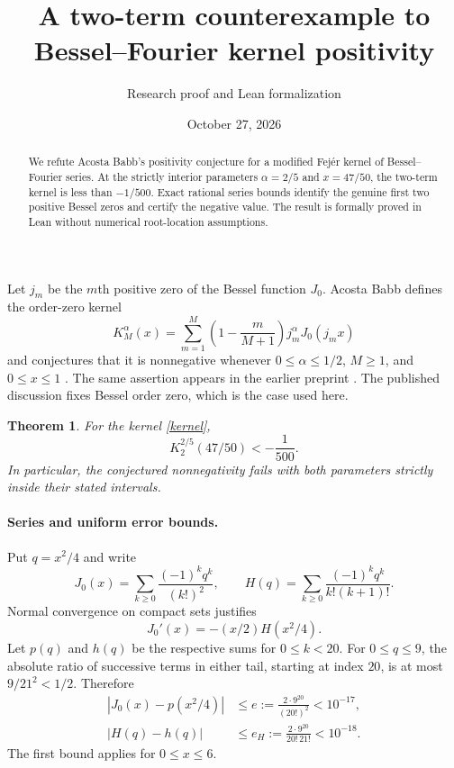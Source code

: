\documentclass[11pt]{article}
\title{A two-term counterexample to Bessel--Fourier kernel positivity}
\author{Research proof and Lean formalization}
\date{October 27, 2026}
\newtheorem{theorem}{Theorem}
\newcommand{\J}{J_0}
\begin{document}
\maketitle
\begin{abstract}
We refute Acosta Babb's positivity conjecture for a modified Fej\'er kernel
of Bessel--Fourier series. At the strictly interior parameters
$\alpha=2/5$ and $x=47/50$, the two-term kernel is less than $-1/500$.
Exact rational series bounds identify the genuine first two positive
Bessel zeros and certify the negative value. The result is formally proved
in Lean without numerical root-location assumptions.
\end{abstract}

Let $j_m$ be the $m$th positive zero of the Bessel function $\J$.
Acosta Babb defines the order-zero kernel
\begin{equation}\label{kernel}
 K_M^\alpha(x)=\sum_{m=1}^{M}\left(1-\frac{m}{M+1}\right)
 j_m^\alpha\J(j_mx)
\end{equation}
and conjectures that it is nonnegative whenever
$0\leq\alpha\leq1/2$, $M\geq1$, and $0\leq x\leq1$
\cite[Conjecture~1, p.~11]{Babb26}.
The same assertion appears in the earlier preprint
\cite[Conjecture~1, p.~10]{Babb24}.
The published discussion fixes Bessel order zero, which is the case used here.

\begin{theorem}\label{main}
For the kernel \eqref{kernel},
\[
 K_2^{2/5}(47/50)<-\frac1{500}.
\]
In particular, the conjectured nonnegativity fails with both parameters
strictly inside their stated intervals.
\end{theorem}

\paragraph{Series and uniform error bounds.}
Put $q=x^2/4$ and write
\[
 \J(x)=\sum_{k\geq0}\frac{(-1)^kq^k}{(k!)^2},\qquad
 H(q)=\sum_{k\geq0}\frac{(-1)^kq^k}{k!(k+1)!}.
\]
Normal convergence on compact sets justifies
\[\J'(x)=-(x/2)H(x^2/4).\]
Let $p(q)$ and $h(q)$ be the respective sums for $0\leq k<20$.
For $0\leq q\leq9$, the absolute ratio of successive terms in either tail,
starting at index $20$, is at most $9/21^2<1/2$. Therefore
\begin{equation}\label{tails}
 \begin{aligned}
 \left|\J(x)-p(x^2/4)\right|&\leq
 e:=\frac{2\cdot9^{20}}{(20!)^2}<10^{-17},\\
 |H(q)-h(q)|&\leq
 e_H:=\frac{2\cdot9^{20}}{20!\,21!}<10^{-18}.
 \end{aligned}
\end{equation}
The first bound applies for $0\leq x\leq6$.
\end{document}
